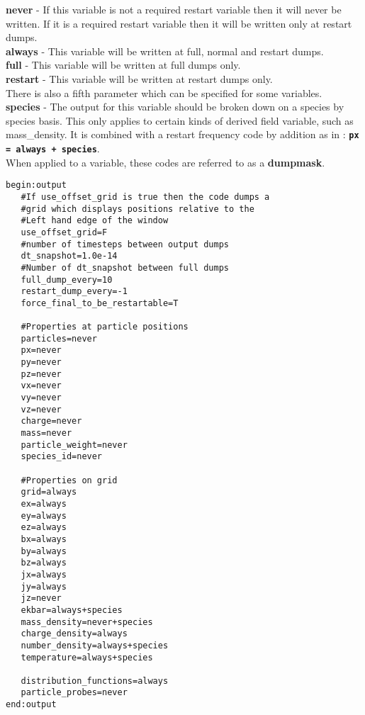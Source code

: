 \documentclass[12pt]{article}
\newcommand{\emphtext}{\color{warwickdark} \fontfamily{phv}\selectfont\Large\bf}
\newcommand{\boxverbatim}[1]{\begin{Verbatim}[obeytabs=true,frame=single,
  framerule=0.5mm,rulecolor=\color{warwickmid},label=#1]}
\newcommand{\inlinecode}[1]{{\color{warwickred} \bf\texttt{#1}}}
\newcommand{\inlineemph}[1]{{\color{warwicklight} \bf{#1}}}
\begin{document}
{\emphtext never} - If this variable is not a required restart variable then it
will never be written. If it is a required restart variable then it will be
written only at restart dumps.\\

{\emphtext always} - This variable will be written at full, normal and restart
dumps.\\

{\emphtext full} - This variable will be written at full dumps only.\\

{\emphtext restart} - This variable will be written at restart dumps only.\\

There is also a fifth parameter which can be specified for some variables.\\

{\emphtext species} - The output for this variable should be broken down on a
species by species basis. This only applies to certain kinds of derived field
variable, such as mass\_density. It is combined with a restart frequency code
by addition as in : \inlinecode{px = always + species}.\\

When applied to a variable, these codes are referred to as a
\inlineemph{dumpmask}.\\

\boxverbatim{output block}
begin:output
   #If use_offset_grid is true then the code dumps a
   #grid which displays positions relative to the
   #Left hand edge of the window
   use_offset_grid=F
   #number of timesteps between output dumps
   dt_snapshot=1.0e-14
   #Number of dt_snapshot between full dumps
   full_dump_every=10
   restart_dump_every=-1
   force_final_to_be_restartable=T

   #Properties at particle positions
   particles=never
   px=never
   py=never
   pz=never
   vx=never
   vy=never
   vz=never
   charge=never
   mass=never
   particle_weight=never
   species_id=never

   #Properties on grid
   grid=always
   ex=always
   ey=always
   ez=always
   bx=always
   by=always
   bz=always
   jx=always
   jy=always
   jz=never
   ekbar=always+species
   mass_density=never+species
   charge_density=always
   number_density=always+species
   temperature=always+species

   distribution_functions=always
   particle_probes=never
end:output
\end{Verbatim}
\end{document}
